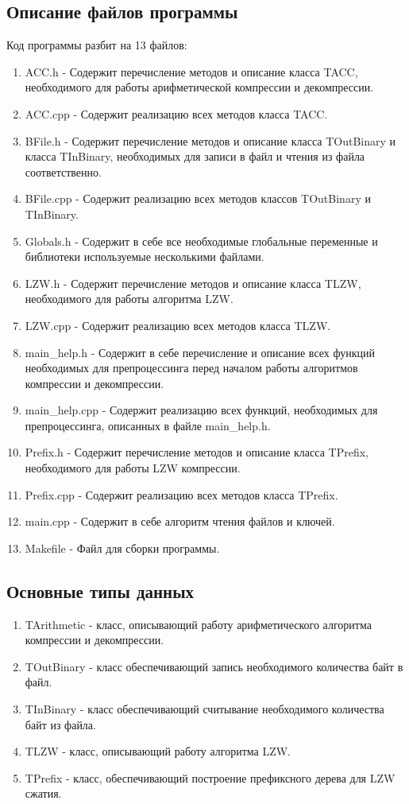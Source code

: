 \documentclass[12pt]{article}
\begin{document}
	\subsection*{Описание файлов программы}
	
	Код программы разбит на 13 файлов:
	
	\begin{enumerate}
		\item ACC.h - Содержит перечисление методов и описание класса TACC, необходимого для работы арифметической компрессии и декомпрессии. 
		\item ACC.cpp - Содержит реализацию всех методов класса TACC.
		\item BFile.h - Содержит перечисление методов и описание класса TOutBinary и класса TInBinary, необходимых для записи в файл и чтения из файла соответственно.
		\item BFile.cpp - Содержит реализацию всех методов классов TOutBinary и TInBinary.
		\item Globals.h - Содержит в себе все необходимые глобальные переменные и библиотеки используемые несколькими файлами.
		\item LZW.h - Содержит перечисление методов и описание класса TLZW, необходимого для работы алгоритма LZW.
		\item LZW.cpp - Содержит реализацию всех методов класса TLZW.
		\item main\_help.h - Содержит в себе перечисление и описание всех функций необходимых для препроцессинга перед началом работы алгоритмов компрессии и декомпрессии.
		\item main\_help.cpp - Содержит реализацию всех функций, необходимых для препроцессинга, описанных в файле main\_help.h.
		\item Prefix.h - Содержит перечисление методов и описание класса TPrefix, необходимого для работы LZW компрессии.
		\item Prefix.cpp - Содержит реализацию всех методов класса TPrefix.
		\item main.cpp - Содержит в себе алгоритм чтения файлов и ключей.
		\item Makefile - Файл для сборки программы.
	\end{enumerate}
	
	\subsection*{Основные типы данных}
	
	\begin{enumerate}
		\item TArithmetic - класс, описывающий работу арифметического алгоритма компрессии и декомпрессии.
		\item TOutBinary - класс обеспечивающий запись необходимого количества байт в файл.
		\item TInBinary - класс обеспечивающий считывание необходимого количества байт из файла.
		\item TLZW - класс, описывающий работу алгоритма LZW.
		\item TPrefix - класс, обеспечивающий построение префиксного дерева для LZW сжатия.
	\end{enumerate}
	
\end{document}
